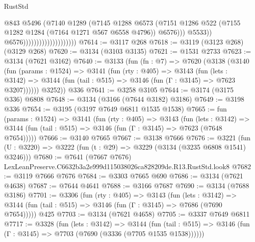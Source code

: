 \begin{lexlean}{RustStd}
\begin{coremodule}
                                                @843
                                                @5496
                                                (@7140
                                                  @1289
                                                  (@7145
                                                    @1288
                                                    @6573
                                                    (@7151
                                                      @1286
                                                      @522
                                                      (@7155
                                                        @1282
                                                        @1284
                                                        (@7164 @1271 @567 @6558 @4796))
                                                      @6576)))
                                                @5533))
                                            @6576))))))))))))))))))))
@7614 := @3117 @268
@7618 := @3119 (@3123 @268) (@3129 @268)
@7620 := @3134 (@3103 @3135)
@7621 := @1531 @2733
@7623 := @3134 (@7621 @3162)
@7640 := @3133
    (fun (fn : @7) =>
    @7620
      (@3138
        (@3140
          (fun (params : @1524) =>
          @3141
            (fun (rty : @405) =>
            @3143
              (fun (lets : @3142) =>
              @3144 (fun (tail : @515) => @3146 (fun (Γ : @3145) => @7623 @3207))))))
        @3252))
    @336
@7641 := @3258 @3105
@7644 := @3174 (@3175 @336) @6808
@7648 := @3134 (@3166 (@7644 @3182) @3186)
@7649 := @3198 @336
@7654 := @3195 (@3197 @7649 @6811 @1535 @1538)
@7665 := fun (params : @1524) =>
  @3141
    (fun (rty : @405) =>
    @3143
      (fun (lets : @3142) =>
      @3144 (fun (tail : @515) => @3146 (fun (Γ : @3145) => @7623 (@7648 @7654)))))
@7666 := @3140 @7665
@7667 := @3138 @7666
@7676 := @3221 (fun (U : @3220) => @3222 (fun (t : @29) => @3229 (@3134 (@3235 @6808 @1541) @3246)))
@7680 := @7641 (@7667 @7676) LexLeanPreserve.C6632b3a2e999d115038026ca828209de.R13.RustStd.look8
@7682 := @3119 @7666 @7676
@7684 := @3303 @7665 @690
@7686 := @3134 (@7621 @4638)
@7687 := @7644 @4641
@7688 := @3166 @7687
@7690 := @3134 (@7688 @3186)
@7701 := @3306
    (fun (rty : @405) =>
    @3143
      (fun (lets : @3142) =>
      @3144 (fun (tail : @515) => @3146 (fun (Γ : @3145) => @7686 (@7690 @7654)))))
    @425
@7703 := @3134 (@7621 @4658)
@7705 := @3337 @7649 @6811
@7717 := @3328
    (fun (lets : @3142) =>
    @3144
      (fun (tail : @515) => @3146 (fun (Γ : @3145) => @7703 (@7690 (@3336 (@7705 @1535 @1538))))))

\end{coremodule}
\end{lexlean}
